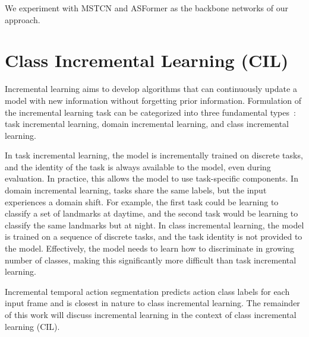 We experiment with MSTCN and ASFormer as the backbone networks of our approach.




\section{Class Incremental Learning (CIL)}

Incremental learning aims to develop algorithms that can continuously update a model with new information without forgetting prior information. Formulation of the incremental learning task can be categorized into three fundamental types~\cite{vandeven2022three}: task incremental learning, domain incremental learning, and class incremental learning.

In task incremental learning, the model is incrementally trained on discrete tasks, and the identity of the task is always available to the model, even during evaluation. In practice, this allows the model to use task-specific components. In domain incremental learning, tasks share the same labels, but the input experiences a domain shift. For example, the first task could be learning to classify a set of landmarks at daytime, and the second task would be learning to classify the same landmarks but at night. In class incremental learning, the model is trained on a sequence of discrete tasks, and the task identity is not provided to the model. Effectively, the model needs to learn how to discriminate in growing number of classes, making this significantly more difficult than task incremental learning.

Incremental temporal action segmentation predicts action class labels for each input frame and is closest in nature to class incremental learning. The remainder of this work will discuss incremental learning in the context of class incremental learning (CIL).


